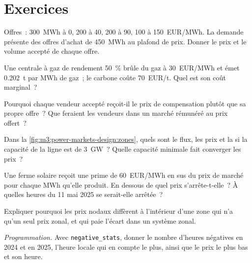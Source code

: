 \section{Exercices}

\begin{exercise}[$\star$]\label{exo:m3:power-markets-design:1}
Offres~: 300~MWh à \qty{0}{}, 200 à \qty{40}{}, 200 à \qty{90}{}, 100 à \qty{150}{EUR/MWh}.
La demande présente des offres d'achat de 450~MWh au plafond de prix. Donner le prix et le volume accepté de chaque offre.
\end{exercise}

\begin{exercise}[$\star$]\label{exo:m3:power-markets-design:2}
Une centrale à gaz de rendement 50~\% brûle du gaz à \qty{30}{EUR/MWh} et émet 0.202~t par MWh de
gaz~; le carbone coûte \qty{70}{EUR/t}. Quel est son coût marginal~?
\end{exercise}

\begin{exercise}[$\star$]\label{exo:m3:power-markets-design:3}
Pourquoi chaque vendeur accepté reçoit-il le prix de compensation plutôt que sa propre offre~? Que
feraient les vendeurs dans un marché rémunéré au prix offert~?
\end{exercise}

\begin{exercise}[$\star\star$]\label{exo:m3:power-markets-design:4}
Dans la \cref{fig:m3:power-markets-design:zones}, quels sont le flux, les prix et la
 si la capacité de la ligne est de 3~GW~? Quelle capacité minimale
fait converger les prix~?
\end{exercise}

\begin{exercise}[$\star\star$]\label{exo:m3:power-markets-design:5}
Une ferme solaire reçoit une prime de \qty{60}{EUR/MWh} en sus du prix de marché pour chaque
MWh qu'elle produit. En dessous de quel prix s'arrête-t-elle~? À quelles heures du 11 mai 2025
se serait-elle arrêtée~?
\end{exercise}

\begin{exercise}[$\star\star$]\label{exo:m3:power-markets-design:6}
Expliquer pourquoi les prix nodaux diffèrent à l'intérieur d'une zone qui n'a qu'un seul prix zonal, et qui paie
l'écart dans un système zonal.
\end{exercise}

\begin{exercise}[$\star\star\star$]\label{exo:m3:power-markets-design:7}
\emph{Programmation.} Avec \texttt{negative\_stats}, donner le nombre d'heures négatives en 2024 et
en 2025, l'heure locale qui en compte le plus, ainsi que le prix le plus bas et son heure.
\end{exercise}

